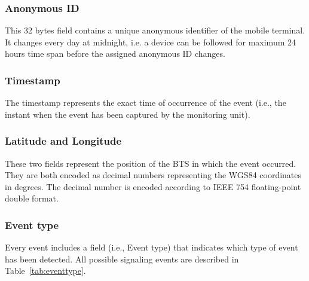 \documentclass[master,english]{hgbthesis}
\begin{document}
\subsubsection{Anonymous ID}
\label{sec:anonymous}
This 32 bytes field contains a unique anonymous identifier of the mobile terminal. It changes every day at midnight, i.e. a device can be followed for maximum 24 hours time span before the assigned anonymous ID changes.
\subsubsection{Timestamp} The timestamp represents the exact time of occurrence of the event (i.e., the instant when the event has been captured by the monitoring unit).
\subsubsection{Latitude and Longitude}
These two fields represent the position of the BTS in which the event occurred. They are both encoded as decimal numbers representing the WGS84 coordinates in degrees. The decimal number is encoded according to IEEE 754 floating-point double format\cite{IEEE754}.
\subsubsection{Event type}
Every event includes a field (i.e., Event type) that indicates which type of event
has been detected. All possible signaling events are described in Table~\ref{tab:eventtype}.
\end{document}
